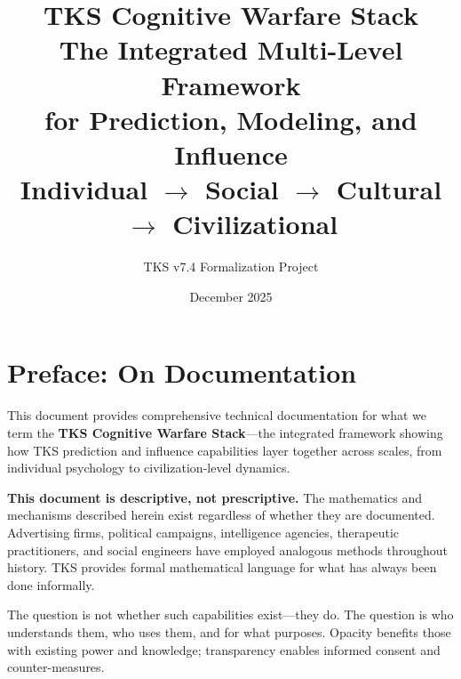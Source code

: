 \documentclass[11pt,twoside]{book}
\begin{document}
\title{\textbf{TKS Cognitive Warfare Stack} \\[0.5em]
\Large The Integrated Multi-Level Framework \\
for Prediction, Modeling, and Influence \\[0.3em]
\normalsize Individual $\to$ Social $\to$ Cultural $\to$ Civilizational}
\author{TKS v7.4 Formalization Project}
\date{December 2025}
\maketitle

\tableofcontents

\chapter*{Preface: On Documentation}

\begin{tcolorbox}[colback=gray!10!white,colframe=gray!75!black,title=\textbf{Scope and Intent},breakable]
This document provides comprehensive technical documentation for what we term the
\textbf{TKS Cognitive Warfare Stack}---the integrated framework showing how TKS
prediction and influence capabilities layer together across scales, from individual
psychology to civilization-level dynamics.

\textbf{This document is descriptive, not prescriptive.} The mathematics and
mechanisms described herein exist regardless of whether they are documented.
Advertising firms, political campaigns, intelligence agencies, therapeutic
practitioners, and social engineers have employed analogous methods throughout
history. TKS provides formal mathematical language for what has always been done
informally.

The question is not whether such capabilities exist---they do. The question is
who understands them, who uses them, and for what purposes. Opacity benefits
those with existing power and knowledge; transparency enables informed consent
and counter-measures.
\end{tcolorbox}

\end{document}
